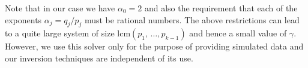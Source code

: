 Note that in our case we have $\alpha_0=2$ and also the requirement that
each of the exponents $\alpha_j = q_j/p_j$ must be rational numbers.
The above restrictions can lead to a quite large system of size
$\mbox{lcm}(p_1,\,\ldots,p_{k-1})$ and hence a small value of $\gamma$.
However, we use this solver only for the purpose of providing simulated data
and our inversion techniques are independent of its use.

